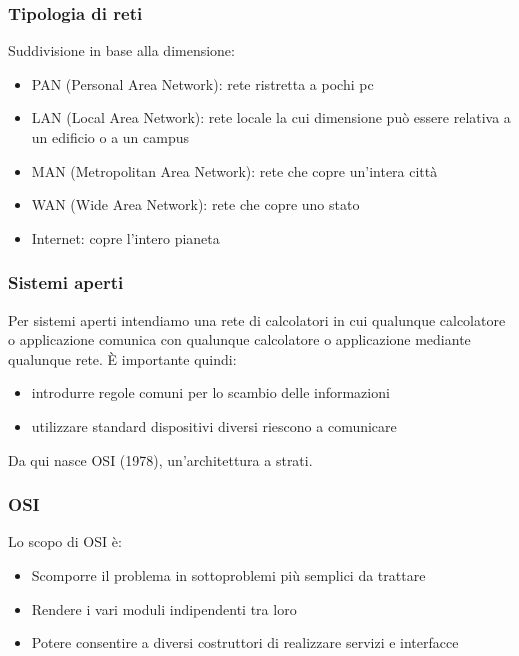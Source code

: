 \documentclass[aspectratio=169]{beamer}
\begin{document}
    
	\begin{frame}
		\frametitle{Tipologia di reti}
		Suddivisione in base alla dimensione:
		\begin{itemize}
			\item PAN (Personal Area Network): rete ristretta a pochi pc
            \item LAN (Local Area Network): rete locale la cui dimensione può essere relativa a un edificio o a un campus
            \item MAN (Metropolitan Area Network): rete che copre un'intera città
            \item WAN (Wide Area Network): rete che copre uno stato
            \item Internet: copre l'intero pianeta
		\end{itemize}
	\end{frame}
	
	\begin{frame}
    	\frametitle{Sistemi aperti}
        Per sistemi aperti intendiamo una rete di calcolatori in cui qualunque calcolatore o applicazione comunica con qualunque calcolatore o applicazione mediante qualunque rete.
        È importante quindi:
        \begin{itemize}
            \item introdurre regole comuni per lo scambio delle informazioni
            \item utilizzare standard \MVRightarrow{} dispositivi diversi riescono a comunicare
        \end{itemize}
        \vskip 0.3cm
        Da qui nasce OSI (1978), un'architettura a strati.
    \end{frame}
 
    \begin{frame}
    	\frametitle{OSI}
		Lo scopo di OSI è:
		\begin{itemize}
		    \item Scomporre il problema in sottoproblemi più semplici da trattare
		    \item Rendere i vari moduli indipendenti tra loro
		    \item Potere consentire a diversi costruttori di realizzare servizi e interfacce
		\end{itemize}
    \end{frame}
    
\end{document}
